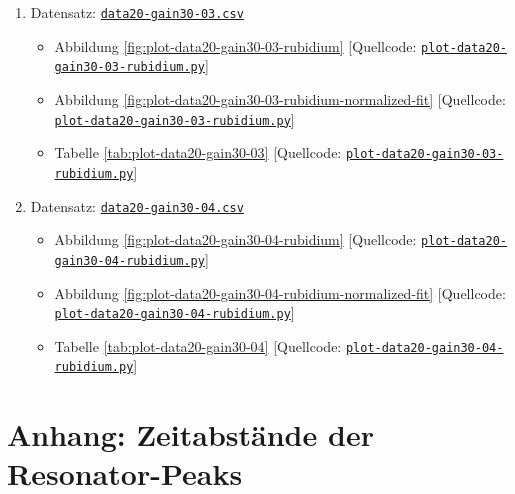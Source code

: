 \begin{appendix}
\begin{enumerate}[1.]
\begin{itemize}
    \end{itemize}
    \item Datensatz: \href{https://github.com/DaHaCoder/H2-Auswertung/blob/main/data/data20-gain30-03.csv}{\lstinline{data20-gain30-03.csv}}
    \begin{itemize}
        \item Abbildung \ref{fig:plot-data20-gain30-03-rubidium} [Quellcode: \href{https://github.com/DaHaCoder/H2-Auswertung/blob/main/code/plot-data20-gain30-03-rubidium.py}{\lstinline{plot-data20-gain30-03-rubidium.py}}]
        \item Abbildung \ref{fig:plot-data20-gain30-03-rubidium-normalized-fit} [Quellcode: \href{https://github.com/DaHaCoder/H2-Auswertung/blob/main/code/plot-data20-gain30-03-rubidium.py}{\lstinline{plot-data20-gain30-03-rubidium.py}}]
        \item Tabelle \ref{tab:plot-data20-gain30-03} [Quellcode: \href{https://github.com/DaHaCoder/H2-Auswertung/blob/main/code/plot-data20-gain30-03-rubidium.py}{\lstinline{plot-data20-gain30-03-rubidium.py}}]
    \end{itemize}
    \item Datensatz: \href{https://github.com/DaHaCoder/H2-Auswertung/blob/main/data/data20-gain30-04.csv}{\lstinline{data20-gain30-04.csv}}
    \begin{itemize}
        \item Abbildung \ref{fig:plot-data20-gain30-04-rubidium} [Quellcode: \href{https://github.com/DaHaCoder/H2-Auswertung/blob/main/code/plot-data20-gain30-04-rubidium.py}{\lstinline{plot-data20-gain30-04-rubidium.py}}]
        \item Abbildung \ref{fig:plot-data20-gain30-04-rubidium-normalized-fit} [Quellcode: \href{https://github.com/DaHaCoder/H2-Auswertung/blob/main/code/plot-data20-gain30-04-rubidium.py}{\lstinline{plot-data20-gain30-04-rubidium.py}}]
        \item Tabelle \ref{tab:plot-data20-gain30-04} [Quellcode: \href{https://github.com/DaHaCoder/H2-Auswertung/blob/main/code/plot-data20-gain30-04-rubidium.py}{\lstinline{plot-data20-gain30-04-rubidium.py}}]
    \end{itemize}
\end{enumerate}

\cleardoublepage{}

\chapter{Anhang: Zeitabstände der Resonator-Peaks}
\label{app:time-to-freq}


\end{appendix}

